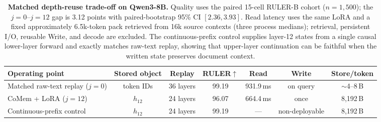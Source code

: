 \begin{table}[t]
\centering
\small
\setlength{\tabcolsep}{4.2pt}
\begin{tabular}{@{}lcccccc@{}}
\toprule
\textbf{Operating point} & \textbf{Stored object} & \textbf{Replay} &
\textbf{RULER}$\uparrow$ & \textbf{Read} & \textbf{Write} &
\textbf{Store/token} \\
\midrule
Matched raw-text replay ($j{=}0$) & token IDs & 36 layers &
99.19 & 931.9\,ms & on query & $\sim$4--8\,B \\
CoMem + LoRA ($j{=}12$) & $h_{12}$ & 24 layers &
96.07 & 664.4\,ms & once & 8,192\,B \\
Continuous-prefix control & $h_{12}$ & 24 layers &
99.19 & --- & non-deployable & 8,192\,B \\
\bottomrule
\end{tabular}
\caption{\textbf{Matched depth-reuse trade-off on Qwen3-8B.}
Quality uses the paired 15-cell RULER-B cohort ($n{=}1{,}500$); the
$j{=}0$--$j{=}12$ gap is 3.12 points with paired-bootstrap 95\% CI
$[2.36,3.93]$. Read latency uses the same LoRA and a fixed approximately
6.5k-token pack retrieved from 16k source contexts
(three process medians); retrieval, persistent I/O, reusable Write, and decode
are excluded. The continuous-prefix control supplies layer-12 states from a
single causal lower-layer forward and exactly matches raw-text replay, showing
that upper-layer continuation can be faithful when the written state preserves
document context.}
\label{tab:core-tradeoff}
\end{table}
